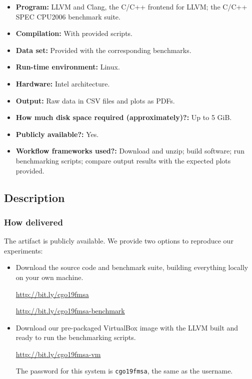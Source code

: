 \documentclass{sigplanconf}
\begin{document}
{\small
\begin{itemize}
  \item {\bf Program: } LLVM and Clang, the C/C++ frontend for LLVM; the C/C++ SPEC CPU2006 benchmark suite.
  \item {\bf Compilation: } With provided scripts.
  \item {\bf Data set: } Provided with the corresponding benchmarks.
  \item {\bf Run-time environment: } Linux.
  \item {\bf Hardware: } Intel architecture.
  \item {\bf Output: } Raw data in CSV files and plots as PDFs.
  \item {\bf How much disk space required (approximately)?: } Up to 5 GiB.
  \item {\bf Publicly available?: } Yes.
  \item {\bf Workflow frameworks used?: } Download and unzip; build software; run benchmarking scripts; compare output results with the expected plots provided.
\end{itemize}

\subsection{Description}

\subsubsection{How delivered}

The artifact is publicly available.
We provide two options to reproduce our experiments:

\begin{itemize}
  \item Download the source code and benchmark suite, building everything locally on your own machine.

\url{http://bit.ly/cgo19fmsa}

\url{http://bit.ly/cgo19fmsa-benchmark}

  \item Download our pre-packaged VirtualBox image with the LLVM built and ready
to run the benchmarking scripts.

\url{http://bit.ly/cgo19fmsa-vm}

The password for this system is \texttt{cgo19fmsa}, the same as the username.


\end{itemize}}
\end{document}
